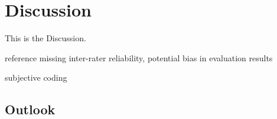 
\section{Discussion}
\label{sec:discussion}
This is the Discussion.

reference missing inter-rater reliability,
potential bias in evaluation results

subjective coding



\subsection{Outlook}
\label{subsec:outlook}
